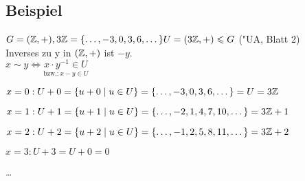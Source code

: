 {\begin{enumerate}
\end{enumerate}}

\subsection{Beispiel}

$G = (\mathbb{Z}, +), 3 \mathbb{Z} = \{\dots, -3,0,3,6,\dots\}\\
U = (3 \mathbb{Z}, +) \leqslant G$ ("UA, Blatt 2)\\
Inverses zu y in $(\mathbb{Z},+)$ ist $-y$.\\
$x \sim y \Leftrightarrow \underset{\text{bzw.:}\, x-y \in U}{x \cdot y ^{-1} \in U}$ 


$ x=0 : U+0 = \{u+0 \;|\; u \in U\}= \{\dots, -3,0,3,6,\dots\} = U = 3\mathbb{Z}$
   
$x=1 : U+1 = \{u+1 \;|\; u \in U\} = \{\dots, -2, 1, 4, 7, 10, \dots \} = 3\mathbb{Z} +1$

$x=2 : U+2 = \left\{u + 2 \;|\; u \in U\right\} = \left\{\dots, -1, 2, 5, 8, 11, \dots\right\} = 3 \mathbb{Z} + 2$

$x=3: U+3 = U+0 = 0$

\dots